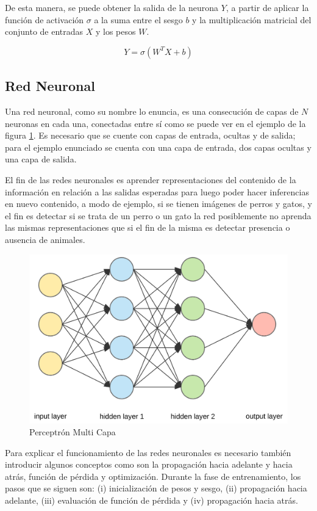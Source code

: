 De esta manera, se puede obtener la salida de la neurona \(Y\), a partir de aplicar la función de activación \(\sigma\) a la suma entre el sesgo \(b\) y la multiplicación matricial del conjunto de entradas \(X\) y los pesos \(W\).

\begin{equation}
Y=\sigma\left(W^{T} X+b\right)
\end{equation}


\subsection{Red Neuronal}\label{red_neuronal}
 Una red neuronal, como su nombre lo enuncia, es una consecución de capas de \(N\) neuronas en cada una, conectadas entre sí como se puede ver en el ejemplo de la figura \ref{fig:redneuronal}. Es necesario que se cuente con capas de entrada, ocultas y de salida; para el ejemplo enunciado se cuenta con una capa de entrada, dos capas ocultas y una capa de salida. 
 
 El fin de las redes neuronales es aprender representaciones del contenido de la información en relación a las salidas esperadas para luego poder hacer inferencias en nuevo contenido, a modo de ejemplo, si se tienen imágenes de perros y gatos, y el fin es detectar si se trata de un perro o un gato la red posiblemente no aprenda las mismas representaciones que si el fin de la misma es detectar presencia o ausencia de animales.
 
 
 \begin{figure}[!h]
 	\centering
 	\includegraphics[width=0.7\linewidth]{images/red_neuronal}
 	\caption[Ejemplo red neuronal]{Perceptrón Multi Capa}
 	\label{fig:redneuronal}
 \end{figure}

 Para explicar el funcionamiento de las redes neuronales es necesario también introducir algunos conceptos como son la propagación hacia adelante y hacia atrás, función de pérdida y optimización. Durante la fase de entrenamiento, los pasos que se siguen son:
 (i) inicialización de pesos y sesgo, (ii) propagación hacia adelante, (iii) evaluación de función de pérdida y (iv) propagación hacia atrás.
 
